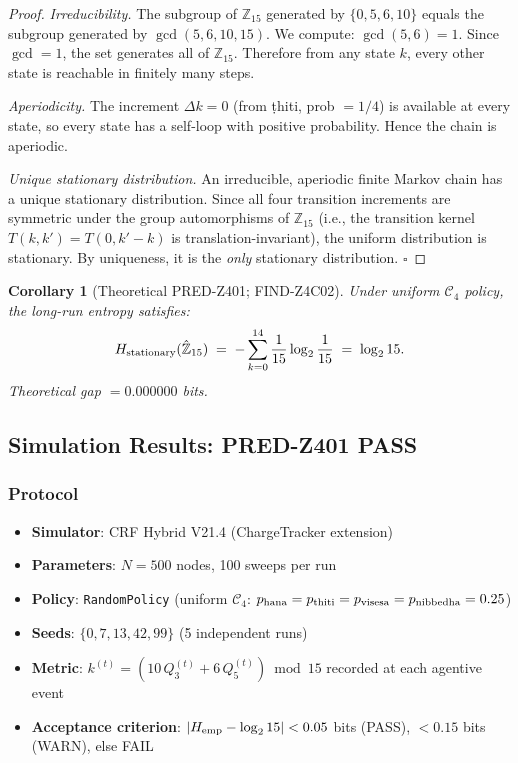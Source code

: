 \documentclass[12pt, a4paper]{article}
\newtheorem{corollary}{Corollary}[section]
\begin{document}
\begin{proof}
\emph{Irreducibility.} The subgroup of $\mathbb{Z}_{15}$ generated by
$\{0, 5, 6, 10\}$ equals the subgroup generated by $\gcd(5, 6, 10, 15)$.
We compute: $\gcd(5,6) = 1$. Since $\gcd = 1$, the set generates all
of $\mathbb{Z}_{15}$. Therefore from any state $k$, every other state
is reachable in finitely many steps.

\emph{Aperiodicity.} The increment $\Delta k = 0$ (from ṭhiti, prob
$= 1/4$) is available at every state, so every state has a self-loop
with positive probability. Hence the chain is aperiodic.

\emph{Unique stationary distribution.} An irreducible, aperiodic
finite Markov chain has a unique stationary distribution. Since all
four transition increments are symmetric under the group automorphisms
of $\mathbb{Z}_{15}$ (i.e., the transition kernel $T(k,k') = T(0,k'-k)$
is translation-invariant), the uniform distribution is stationary.
By uniqueness, it is the \emph{only} stationary distribution.
\hfill$\square$
\end{proof}

\begin{corollary}[Theoretical PRED-Z401; FIND-Z4C02]
Under uniform $\mathcal{C}_4$ policy, the long-run entropy satisfies:
\[
  H_{\rm stationary}(\hat{\mathbb{Z}}_{15})
  \;=\; -\sum_{k=0}^{14} \frac{1}{15} \log_2 \frac{1}{15}
  \;=\; \log_2 15.
\]
Theoretical gap $= 0.000000$ bits.
\end{corollary}

\subsection{Simulation Results: PRED-Z401 PASS}
\label{sec:simulation}

\subsubsection{Protocol}

\begin{formalbox}[title={Simulation Protocol}]
\begin{itemize}[leftmargin=*]
  \item \textbf{Simulator}: CRF Hybrid V21.4 (ChargeTracker extension)
  \item \textbf{Parameters}: $N = 500$ nodes, 100 sweeps per run
  \item \textbf{Policy}: \texttt{RandomPolicy} (uniform $\mathcal{C}_4$:
    $p_{\rm hana} = p_{\rm thiti} = p_{\rm visesa} = p_{\rm nibbedha}
    = 0.25$)
  \item \textbf{Seeds}: $\{0, 7, 13, 42, 99\}$ (5 independent runs)
  \item \textbf{Metric}: $k^{(t)} = (10\,Q_3^{(t)} + 6\,Q_5^{(t)})
    \bmod 15$ recorded at each agentive event
  \item \textbf{Acceptance criterion}: $|H_{\rm emp} - \log_2 15|
    < 0.05$ bits (PASS), $< 0.15$ bits (WARN), else FAIL
\end{itemize}
\end{formalbox}
\end{document}
